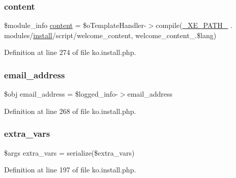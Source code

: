 \subsubsection{\texorpdfstring{content}{content}}
{\footnotesize\ttfamily \$module\+\_\+info \hyperlink{classcontent}{content} = \$o\+Template\+Handler-\/$>$compile(\hyperlink{config_8inc_8php_a5387c7a3f2aa38adf16f324cee88db88}{\+\_\+\+X\+E\+\_\+\+P\+A\+T\+H\+\_\+} . \textquotesingle{}modules/\hyperlink{classinstall}{install}/script/welcome\+\_\+content\textquotesingle{}, \textquotesingle{}welcome\+\_\+content\+\_\+\textquotesingle{}.\$lang)}



Definition at line 274 of file ko.\+install.\+php.

\mbox{\label{ko_8install_8php_a1dffea0d5ba8194f8ef01f414af0c831}} 
\subsubsection{\texorpdfstring{email\+\_\+address}{email\_address}}
{\footnotesize\ttfamily \$obj email\+\_\+address = \$logged\+\_\+info-\/$>$email\+\_\+address}



Definition at line 268 of file ko.\+install.\+php.

\mbox{\label{ko_8install_8php_ae1dcb37fc34a8f312d2e6abd6f806743}} 
\subsubsection{\texorpdfstring{extra\+\_\+vars}{extra\_vars}}
{\footnotesize\ttfamily \$args extra\+\_\+vars = serialize(\$extra\+\_\+vars)}



Definition at line 197 of file ko.\+install.\+php.

\mbox{\label{ko_8install_8php_a683e060c22be3e658be6f9751a2082f0}} 
